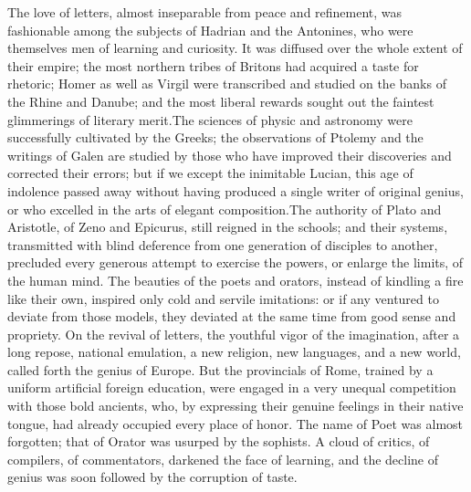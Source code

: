 The love of letters, almost inseparable from peace and
refinement, was fashionable among the subjects of Hadrian and the
Antonines, who were themselves men of learning and curiosity. It
was diffused over the whole extent of their empire; the most
northern tribes of Britons had acquired a taste for rhetoric;
Homer as well as Virgil were transcribed and studied on the banks
of the Rhine and Danube; and the most liberal rewards sought out
the faintest glimmerings of literary merit.\footnotemark[110] The sciences of
physic and astronomy were successfully cultivated by the Greeks;
the observations of Ptolemy and the writings of Galen are studied
by those who have improved their discoveries and corrected their
errors; but if we except the inimitable Lucian, this age of
indolence passed away without having produced a single writer of
original genius, or who excelled in the arts of elegant
composition.\footnotemark[1101] The authority of Plato and Aristotle, of Zeno
and Epicurus, still reigned in the schools; and their systems,
transmitted with blind deference from one generation of disciples
to another, precluded every generous attempt to exercise the
powers, or enlarge the limits, of the human mind. The beauties of
the poets and orators, instead of kindling a fire like their own,
inspired only cold and servile imitations: or if any ventured to
deviate from those models, they deviated at the same time from
good sense and propriety. On the revival of letters, the youthful
vigor of the imagination, after a long repose, national
emulation, a new religion, new languages, and a new world, called
forth the genius of Europe. But the provincials of Rome, trained
by a uniform artificial foreign education, were engaged in a very
unequal competition with those bold ancients, who, by expressing
their genuine feelings in their native tongue, had already
occupied every place of honor. The name of Poet was almost
forgotten; that of Orator was usurped by the sophists. A cloud of
critics, of compilers, of commentators, darkened the face of
learning, and the decline of genius was soon followed by the
corruption of taste.


